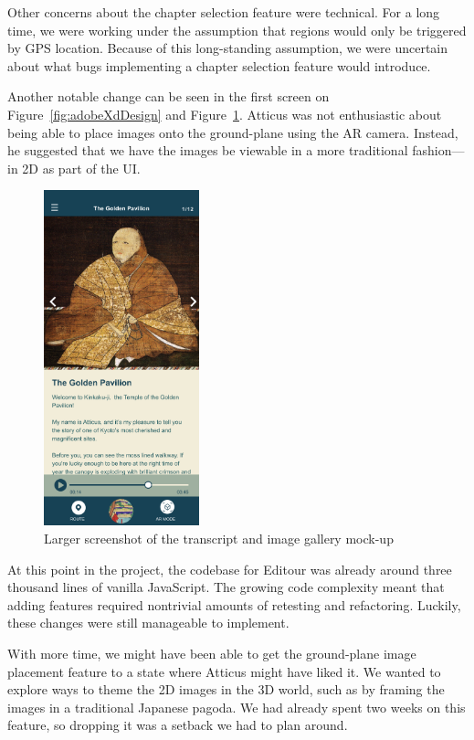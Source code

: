 \documentclass[a4paper, 10pt, american, titlepage]{article}
\begin{document}
Other concerns about the chapter selection feature were technical. For a long
time, we were working under the assumption that regions would only be triggered
by GPS location. Because of this long-standing assumption, we were uncertain
about what bugs implementing a chapter selection feature would introduce.

Another notable change can be seen in the first screen on
Figure~\ref{fig:adobeXdDesign} and Figure~\ref{fig:galleryZoomed}. Atticus was
not enthusiastic about being able to place images onto the ground-plane using
the AR camera. Instead, he suggested that we have the images be viewable in a
more traditional fashion---in 2D as part of the UI.

\begin{figure}[h] \centering
    \includegraphics[width=0.4\textwidth]{gallery-zoomed.png}
    \caption{Larger screenshot of the transcript and image gallery mock-up}
    \label{fig:galleryZoomed}
\end{figure}

At this point in the project, the codebase for Editour was already around three
thousand lines of vanilla JavaScript. The growing code complexity meant that
adding features required nontrivial amounts of retesting and refactoring.
Luckily, these changes were still manageable to implement.

With more time, we might have been able to get the ground-plane image placement
feature to a state where Atticus might have liked it. We wanted to explore ways
to theme the 2D images in the 3D world, such as by framing the images in a
traditional Japanese pagoda. We had already spent two weeks on this feature, so
dropping it was a setback we had to plan around.
\end{document}
